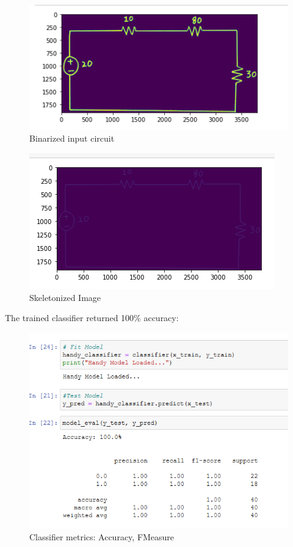 \documentclass[conference]{IEEEtran}
\begin{document}
    \begin{figure}[h!]
        \centering
        \includegraphics[scale=0.7]{images/handy_binarized.PNG}
        \caption{Binarized input circuit}
        \label{fig:binarized}
    \end{figure}
    
    \begin{figure}[h!]
        \centering
        \includegraphics[scale=0.7]{images/skeletonized.PNG}
        \caption{Skeletonized Image}
        \label{fig:Skeletonized}
    \end{figure}
    
    The trained classifier returned 100\% accuracy: 
    
    \begin{figure}[h!]
        \centering
        \includegraphics[scale=0.5]{images/metrics.PNG}
        \caption{Classifier metrics: Accuracy, FMeasure}
        \label{fig:Classifier Evaluaton}
    \end{figure}
\end{document}
